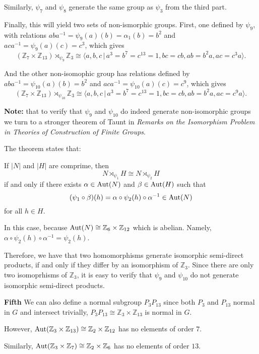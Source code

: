 \documentclass[12pt]{AlgebraQual}
\begin{document}
\begin{solution}
\begin{enumerate}[label=(\alph*)]
    Similarly, $\psi_7$ and $\psi_8$ generate the same group as $\psi_3$ from the third part.

    Finally, this will yield two sets of non-ismorphic groups. First, one defined by $\psi_9$, with relations $aba^{-1}=\psi_9(a)(b)=\alpha_1(b)=b^2$ and $aca^{-1}=\psi_9(a)(c)=c^3$, which gives $$(\mathbb{Z}_7\times \mathbb{Z}_{13})\rtimes_{\psi_9}\mathbb{Z}_3\cong\langle a,b,c\,|\, a^3=b^7=c^{13}=1, bc=cb, ab=b^2a, ac=c^3a\rangle.$$

    And the other non-isomophic group has relations defined by $aba^{-1}=\psi_{10}(a)(b)=b^2$ and $aca^{-1}=\psi_{10}(a)(c)=c^9$, which gives $$(\mathbb{Z}_7\times \mathbb{Z}_{13})\rtimes_{\psi_{10}}\mathbb{Z}_3\cong\langle a,b,c\,|\, a^3=b^7=c^{13}=1, bc=cb, ab=b^2a, ac=c^9a\rangle.$$

    \textbf{Note:} that to verify that $\psi_9$ and $\psi_{10}$ do indeed generate non-isomorphic groups we turn to a stronger theorem of Taunt in \textit{Remarks on the Isomorphism Problem in Theories of Construction of Finite Groups}.

    The theorem states that:
    \begin{framed}
    If $|N|$ and $|H|$ are comprime, then $$N\rtimes_{\psi_1} H\cong N\rtimes_{\psi_2} H$$ if and only if there exists $\alpha\in\text{Aut}(N)$ and $\beta\in \text{Aut}(H)$ such that $$(\psi_1\circ\beta)(h)=\alpha\circ\psi_2(h)\circ\alpha^{-1}\in\text{Aut}(N)$$ for all $h\in H$.
    \end{framed}

    In this case, because $\text{Aut}(N)\cong \mathbb{Z}_6\times\mathbb{Z}_{12}$ which is abelian. Namely, $\alpha\circ\psi_2(h)\circ\alpha^{-1}=\psi_2(h)$.

    Therefore, we have that two homomorphisms generate isomorphic semi-direct products, if and only if they differ by an isomorphism of $\mathbb{Z}_3$. Since there are only two isomoprhisms of $\mathbb{Z}_3$, it is easy to verify that $\psi_9$ and $\psi_{10}$ do not generate isomorphic semi-direct products.


    \textbf{Fifth} We can also define a normal subgroup $P_3P_{13}$ since both $P_3$ and $P_{13}$ normal in $G$ and intersect trivially, $P_3P_{13}\cong\mathbb{Z}_3\times\mathbb{Z}_{13}$ is normal in $G$.

    However, $\text{Aut}(\mathbb{Z}_3\times\mathbb{Z}_{13})\cong\mathbb{Z}_2\times\mathbb{Z}_{12}$ has no elements of order $7$.

    Similarly, $\text{Aut}(\mathbb{Z}_3\times\mathbb{Z}_7)\cong\mathbb{Z}_2\times\mathbb{Z}_6$ has no elements of order $13$.


\end{enumerate}
\end{solution}
\end{document}
